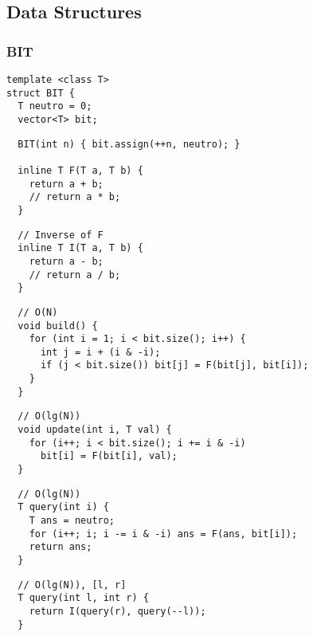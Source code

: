 \documentclass[twoside]{article}
\begin{document}
\begin{multicols*}{2}
\subsection*{Data Structures}
\vspace{2em}
\subsubsectionfont{\large\bfseries\sffamily\underline}
\subsubsection*{BIT}
\begin{verbatim}
template <class T>
struct BIT {
  T neutro = 0;
  vector<T> bit;
\end{verbatim}
\vspace{-12pt}
\begin{verbatim}
  BIT(int n) { bit.assign(++n, neutro); }

  inline T F(T a, T b) {
    return a + b;
    // return a * b;
  }
\end{verbatim}
\vspace{-12pt}
\begin{verbatim}
  // Inverse of F
  inline T I(T a, T b) {
    return a - b;
    // return a / b;
  }
\end{verbatim}
\vspace{-12pt}
\begin{verbatim}
  // O(N)
  void build() {
    for (int i = 1; i < bit.size(); i++) {
      int j = i + (i & -i);
      if (j < bit.size()) bit[j] = F(bit[j], bit[i]);
    }
  }
\end{verbatim}
\vspace{-12pt}
\begin{verbatim}
  // O(lg(N))
  void update(int i, T val) {
    for (i++; i < bit.size(); i += i & -i)
      bit[i] = F(bit[i], val);
  }
\end{verbatim}
\vspace{-12pt}
\begin{verbatim}
  // O(lg(N))
  T query(int i) {
    T ans = neutro;
    for (i++; i; i -= i & -i) ans = F(ans, bit[i]);
    return ans;
  }
\end{verbatim}
\vspace{-12pt}
\begin{verbatim}
  // O(lg(N)), [l, r]
  T query(int l, int r) {
    return I(query(r), query(--l));
  }


\end{verbatim}
\end{multicols*}
\end{document}
